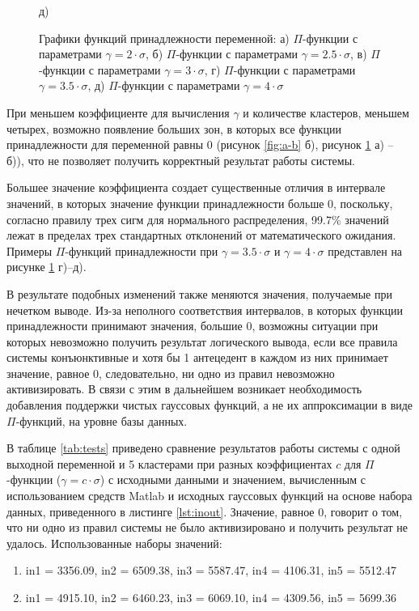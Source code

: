 \begin{figure}[H]
\begin{minipage}[h]{0.49\linewidth}
		д)
	\end{minipage}

	\caption{Графики функций принадлежности переменной: а) $\Pi$-функции с параметрами $\gamma=2\cdot\sigma$, б) $\Pi$-функции с параметрами $\gamma=2.5\cdot\sigma$, в) $\Pi$-функции с параметрами $\gamma=3\cdot\sigma$, г) $\Pi$-функции с параметрами $\gamma=3.5\cdot\sigma$, д) $\Pi$-функции с параметрами $\gamma=4\cdot\sigma$}
	\label{fig:c-else}
\end{figure}

При меньшем коэффициенте для вычисления $\gamma$ и количестве кластеров, меньшем четырех, возможно появление больших зон, в которых все функции принадлежности для переменной равны 0 (рисунок \ref{fig:a-b} б), рисунок \ref{fig:c-else} а) -- б)), что не позволяет получить корректный результат работы системы. 

Большее значение коэффициента создает существенные отличия в интервале значений, в которых значение функции принадлежности больше 0, поскольку, согласно правилу трех сигм для нормального распределения, 99.7\% значений лежат в пределах трех стандартных отклонений от математического ожидания. Примеры $\Pi$-функций принадлежности при $\gamma = 3.5 \cdot \sigma$ и $\gamma = 4 \cdot \sigma$ представлен на рисунке \ref{fig:c-else} г)--д).

В результате подобных изменений также меняются значения, получаемые при нечетком выводе. Из-за неполного соответствия интервалов, в которых функции принадлежности принимают значения, большие 0, возможны ситуации при которых невозможно получить результат логического вывода, если все правила системы конъюнктивные и хотя бы 1 антецедент в каждом из них принимает значение, равное 0, следовательно, ни одно из правил невозможно активизировать. В связи с этим в дальнейшем возникает необходимость добавления поддержки чистых гауссовых функций, а не их аппроксимации в виде $\Pi$-функций, на уровне базы данных.

В таблице \ref{tab:tests} приведено сравнение результатов работы системы с одной выходной переменной и 5 кластерами при разных коэффициентах $c$ для $\Pi$-функции ($\gamma = c \cdot \sigma$) с исходными данными и значением, вычисленным с использованием средств Matlab и исходных гауссовых функций на основе набора данных, приведенного в листинге \ref{lst:inout}. Значение, равное 0, говорит о том, что ни одно из правил системы не было активизировано и получить результат не удалось. Использованные наборы значений:

\begin{enumerate}
	\item in1 = 3356.09, in2 = 6509.38, in3 = 5587.47, in4 = 4106.31, in5 = 5512.47
	\item in1 = 4915.10, in2 = 6460.23, in3 = 6069.10, in4 = 4309.56, in5 = 5699.36
\end{enumerate} 

